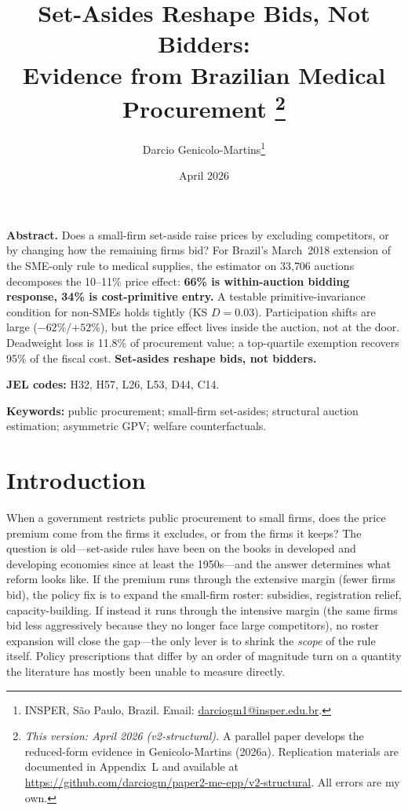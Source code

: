 \documentclass[12pt]{article}
\title{\textbf{Set-Asides Reshape Bids, Not Bidders:\\
Evidence from Brazilian Medical Procurement}%
\thanks{\emph{This version: April 2026 (v2-structural).}
A parallel paper develops the reduced-form evidence in
Genicolo-Martins (2026a). Replication materials are documented
in Appendix~L and available at
\url{https://github.com/darciogm/paper2-me-epp/v2-structural}.
All errors are my own.}}
\author{Darcio Genicolo-Martins\thanks{INSPER, São Paulo, Brazil.
Email: \href{mailto:darciogm1@insper.edu.br}{darciogm1@insper.edu.br}.}}
\date{April 2026}
\begin{document}
\maketitle
\thispagestyle{empty}

\begin{center}
\begin{minipage}{0.85\textwidth}
\small
\begin{singlespace}
\textbf{Abstract.}
Does a small-firm set-aside raise prices by excluding competitors,
or by changing how the remaining firms bid? For Brazil's March~2018
extension of the SME-only rule to medical supplies, the
\citet{campo2003} estimator on 33{,}706 auctions decomposes the
10--11\% price effect: \textbf{66\% is within-auction bidding
response, 34\% is cost-primitive entry.} A testable
primitive-invariance condition for non-SMEs holds tightly
(KS $D = 0.03$). Participation shifts are large ($-62\%$/$+52\%$),
but the price effect lives inside the auction, not at the door.
Deadweight loss is 11.8\% of procurement value; a top-quartile
exemption recovers 95\% of the fiscal cost. \textbf{Set-asides
reshape bids, not bidders.}

\vspace{0.5em}

\noindent \textbf{JEL codes:} H32, H57, L26, L53, D44, C14.

\noindent \textbf{Keywords:} public procurement; small-firm
set-asides; structural auction estimation; asymmetric GPV; welfare
counterfactuals.
\end{singlespace}
\end{minipage}
\end{center}

\clearpage
\setcounter{page}{1}
\pagestyle{plain}

\clearpage
\section{Introduction}

When a government restricts public procurement to small firms, does the
price premium come from the firms it excludes, or from the firms it
keeps? The question is old---set-aside rules have been on the books in
developed and developing economies since at least the 1950s---and the
answer determines what reform looks like. If the premium runs through
the extensive margin (fewer firms bid), the policy fix is to expand the
small-firm roster: subsidies, registration relief, capacity-building.
If instead it runs through the intensive margin (the same firms bid less
aggressively because they no longer face large competitors), no roster
expansion will close the gap---the only lever is to shrink the
\emph{scope} of the rule itself. Policy prescriptions that differ by an
order of magnitude turn on a quantity the literature has mostly been
unable to measure directly.
\end{document}
